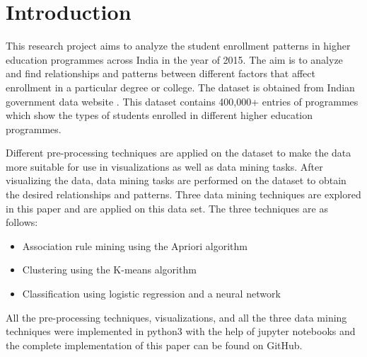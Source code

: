 \section{Introduction}
This research project aims to analyze the student enrollment patterns in higher education programmes across India in the year of 2015. The aim is to analyze and find relationships and patterns between different factors that affect enrollment in a particular degree or college. The dataset is obtained from Indian government data website \cite{b1}. This dataset contains 400,000+ entries of programmes which show the types of students enrolled in different higher education programmes. 

Different pre-processing techniques are applied on the dataset to make the data more suitable for use in visualizations as well as data mining tasks. After visualizing the data, data mining tasks are performed on the dataset to obtain the desired relationships and patterns. Three data mining techniques are explored in this paper and are applied on this data set. The three techniques are as follows:
\begin{itemize}
    \item Association rule mining using the Apriori algorithm \cite{b2}
    \item Clustering using the K-means algorithm \cite{b3}
    \item Classification using logistic regression and a neural network
\end{itemize} 

All the pre-processing techniques, visualizations, and all the three data mining techniques were implemented in python3 with the help of jupyter notebooks and the complete implementation of this paper can be found on GitHub.